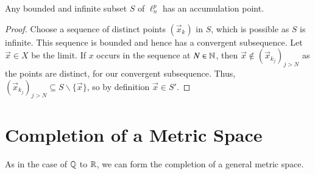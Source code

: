 \begin{cor}
    Any bounded and infinite subset $S$ of $\ell_n^p$ has an accumulation point.
\end{cor}
\begin{proof}
    Choose a sequence of distinct points $(\vec{x}_k)$ in $S$, which is possible as $S$ is infinite. This sequence is bounded and hence has a convergent subsequence. Let $\vec{x} \in X$ be the limit. If $x$ occurs in the sequence at $N \in \mathbb N$, then $\vec{x} \notin (\vec{x}_{k_j})_{j > N}$ as the points are distinct, for our convergent subsequence. Thus, $(\vec{x}_{k_j})_{j > N} \subseteq S\backslash\{\vec{x}\}$, so by definition $\vec{x} \in S'$.
\end{proof}






\section{Completion of a Metric Space}

As in the case of $\mathbb Q$ to $\mathbb R$, we can form the completion of a general metric space.


